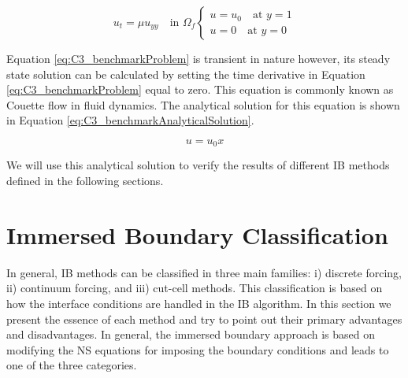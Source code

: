 \begin{subequations}\label{eq:C3_benchmarkProblem}
\begin{equation}
	u_t = \mu u_{yy} \quad \text{in } \Omega_f
\end{equation}
\begin{equation}
\begin{cases}
	u = u_0 \quad \text{at } y = 1 \\
	u = 0 \quad \text{at } y = 0
\end{cases}
\end{equation}
\end{subequations}

Equation \eqref{eq:C3_benchmarkProblem} is transient in nature however, its steady state solution can be calculated by setting the time derivative in Equation \eqref{eq:C3_benchmarkProblem} equal to zero. This equation is commonly known as Couette flow in fluid dynamics. The analytical solution for this equation is shown in Equation \eqref{eq:C3_benchmarkAnalyticalSolution}.

\begin{equation}\label{eq:C3_benchmarkAnalyticalSolution}
	u = u_0 x
\end{equation}

We will use this analytical solution to verify the results of different IB methods defined in the following sections.

\section{Immersed Boundary Classification}
In general, IB methods can be classified in three main families: i) discrete forcing, ii) continuum forcing, and iii) cut-cell methods. This classification is based on how the interface conditions are handled in the IB algorithm. In this section we present the essence of each method and try to point out their primary advantages and disadvantages. In general, the immersed boundary approach is based on modifying the NS equations for imposing the boundary conditions and leads to one of the three categories.





